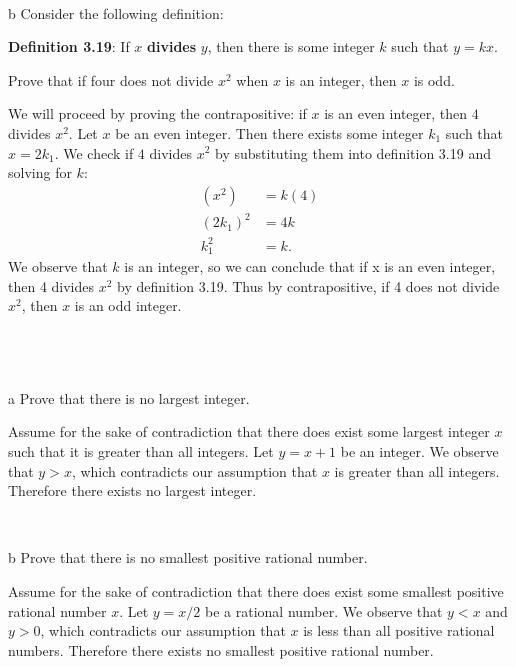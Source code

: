 \documentclass{article}
\begin{document}
\

\begin{problem} b
Consider the following definition: 

\textbf{Definition 3.19}: 
If $x$ \textbf{divides} $y$, then there is some integer $k$ such that $y = kx$.

Prove that if four does not divide $x^2$ when $x$ is an integer, then $x$ is odd. 
\end{problem}

We will proceed by proving the contrapositive: if $x$ is an even integer, then $4$ divides $x^2$. Let $x$ be an even integer. Then there exists some integer $k_1$ such that $x=2k_1$. We check if $4$ divides $x^2$ by substituting them into definition 3.19 and solving for $k$:
\begin{align*}
    (x^2) &= k(4) \\
    (2k_1)^2 &= 4k \\
    k_1^2 &= k.
\end{align*}
We observe that $k$ is an integer, so we can conclude that if x is an even integer, then 4 divides $x^2$ by definition 3.19. Thus by contrapositive, if 4 does not divide $x^2$, then $x$ is an odd integer.

\
\hline
\section{}

\begin{problem} a
Prove that there is no largest integer.
\end{problem}

Assume for the sake of contradiction that there does exist some largest integer $x$ such that it is greater than all integers. Let $y=x+1$ be an integer. We observe that $y>x$, which contradicts our assumption that $x$ is greater than all integers. Therefore there exists no largest integer.

\

\begin{problem} b
Prove that there is no smallest positive rational number.
\end{problem}

Assume for the sake of contradiction that there does exist some smallest positive rational number $x$. Let $y=x/2$ be a rational number. We observe that $y<x$ and $y>0$, which contradicts our assumption that $x$ is less than all positive rational numbers. Therefore there exists no smallest positive rational number.
\end{document}
